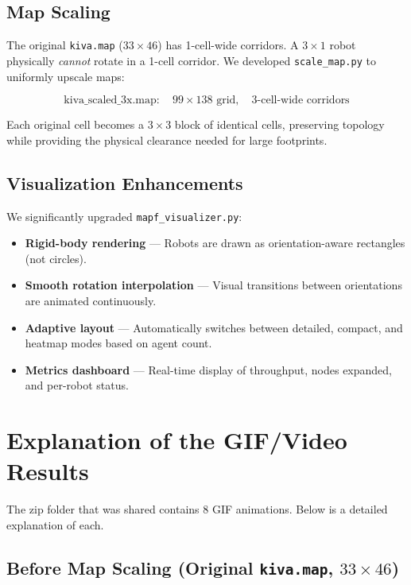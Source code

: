 \documentclass[12pt, a4paper]{article}
\begin{document}
\subsection{Map Scaling}

The original \texttt{kiva.map} ($33\times46$) has 1-cell-wide corridors. A $3\times1$ robot physically \emph{cannot} rotate in a 1-cell corridor. We developed \texttt{scale\_map.py} to uniformly upscale maps:

\[
\text{kiva\_scaled\_3x.map}: \quad 99 \times 138 \text{ grid}, \quad \text{3-cell-wide corridors}
\]

Each original cell becomes a $3\times3$ block of identical cells, preserving topology while providing the physical clearance needed for large footprints.

\subsection{Visualization Enhancements}

We significantly upgraded \texttt{mapf\_visualizer.py}:
\begin{itemize}
    \item \textbf{Rigid-body rendering} --- Robots are drawn as orientation-aware rectangles (not circles).
    \item \textbf{Smooth rotation interpolation} --- Visual transitions between orientations are animated continuously.
    \item \textbf{Adaptive layout} --- Automatically switches between detailed, compact, and heatmap modes based on agent count.
    \item \textbf{Metrics dashboard} --- Real-time display of throughput, nodes expanded, and per-robot status.
\end{itemize}

\section{Explanation of the GIF/Video Results}
\label{sec:gifs}

The zip folder that was shared contains 8 GIF animations. Below is a detailed explanation of each.

\subsection{Before Map Scaling (Original \texttt{kiva.map}, $33\times46$)}
\end{document}
